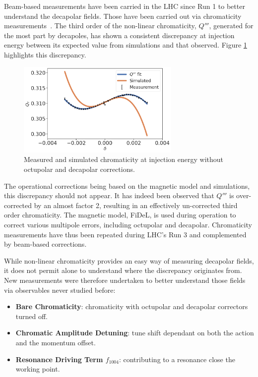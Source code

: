 Beam-based measurements have been carried in the LHC since Run 1 to better understand the decapolar
fields. Those have been carried out via chromaticity
measurements~\cite{maclean_non-linear_2011,maclean_commissioning_2016,maclean_measurement_2014}. 
The third order of the non-linear chromaticity, $Q'''$, generated for the most part by decapoles,
has shown a consistent discrepancy at injection energy between its expected value from simulations
and that observed. Figure \ref{fig:decapoles:bare_chroma_vs_simulations} highlights this
discrepancy.

\begin{figure}[H]
    \centering
    \includegraphics[width=0.7\textwidth]{images/bare_chroma_simulated.png}
    \caption{Measured and simulated chromaticity at injection energy without octupolar and
             decapolar corrections. }
    \label{fig:decapoles:bare_chroma_vs_simulations}
\end{figure}

The operational corrections being based on the magnetic model and simulations, this 
discrepancy should not appear.
It has indeed been observed that $Q'''$ is over-corrected by an almost factor 2, resulting in an
effectively un-corrected third order chromaticity. The magnetic model, FiDeL, is used during
operation to correct various multipole errors, including octupolar and decapolar.  Chromaticity
measurements have thus been repeated during LHC's Run 3 and complemented by beam-based corrections.

While non-linear chromaticity provides an easy way of measuring decapolar fields, it does not permit
alone to understand where the discrepancy originates from. New measurements were therefore
undertaken to better understand those fields via observables never studied before:
\begin{itemize}
    \tightlist
    \item \textbf{Bare Chromaticity}: chromaticity with octupolar and decapolar correctors turned off.
    \item \textbf{Chromatic Amplitude Detuning}: tune shift dependant on both the action and the momentum 
    offset.
    \item \textbf{Resonance Driving Term $f_{1004}$}: contributing to a resonance close the working point.
\end{itemize}



